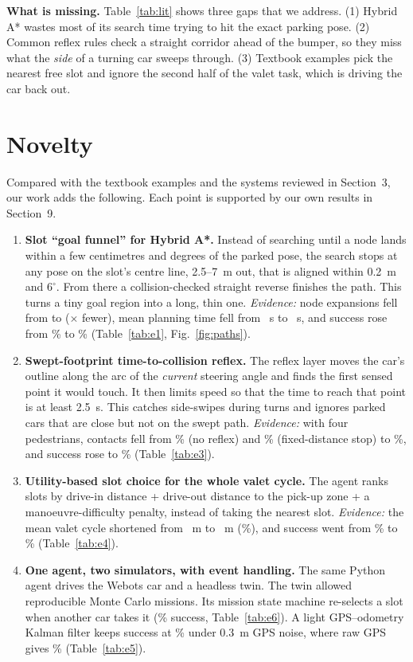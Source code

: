 \documentclass[12pt,a4paper]{article}
\begin{document}
\textbf{What is missing.} Table~\ref{tab:lit} shows three gaps that we address. (1) Hybrid A* wastes most of its search time trying to hit the exact parking pose. (2) Common reflex rules check a straight corridor ahead of the bumper, so they miss what the \emph{side} of a turning car sweeps through. (3) Textbook examples pick the nearest free slot and ignore the second half of the valet task, which is driving the car back out.

\section{Novelty}
Compared with the textbook examples and the systems reviewed in Section~3, our work adds the following. Each point is supported by our own results in Section~9.

\begin{enumerate}[itemsep=3pt,topsep=2pt]
\item \textbf{Slot ``goal funnel'' for Hybrid A*.} Instead of searching until a node lands within a few centimetres and degrees of the parked pose, the search stops at any pose on the slot's centre line, 2.5--7~m out, that is aligned within 0.2~m and $6^\circ$. From there a collision-checked straight reverse finishes the path. This turns a tiny goal region into a long, thin one. \emph{Evidence:} node expansions fell from \EOneExpNoFunnel{} to \EOneExpFunnel{} (\EOneExpRatio$\times$ fewer), mean planning time fell from \EOnePlanNoFunnel{}~s to \EOnePlanFunnel{}~s, and success rose from \EOneSuccNoFunnel\% to \EOneSuccFunnel\% (Table~\ref{tab:e1}, Fig.~\ref{fig:paths}).
\item \textbf{Swept-footprint time-to-collision reflex.} The reflex layer moves the car's outline along the arc of the \emph{current} steering angle and finds the first sensed point it would touch. It then limits speed so that the time to reach that point is at least 2.5~s. This catches side-swipes during turns and ignores parked cars that are close but not on the swept path. \emph{Evidence:} with four pedestrians, contacts fell from \EThreeCollNone\% (no reflex) and \EThreeCollFixed\% (fixed-distance stop) to \EThreeCollTTC\%, and success rose to \EThreeSuccTTC\% (Table~\ref{tab:e3}).
\item \textbf{Utility-based slot choice for the whole valet cycle.} The agent ranks slots by drive-in distance + drive-out distance to the pick-up zone + a manoeuvre-difficulty penalty, instead of taking the nearest slot. \emph{Evidence:} the mean valet cycle shortened from \EFourCycleNear{}~m to \EFourCycleUtil{}~m (\EFourCycleGain\%), and success went from \EFourSuccNear\% to \EFourSuccUtil\% (Table~\ref{tab:e4}).
\item \textbf{One agent, two simulators, with event handling.} The same Python agent drives the Webots car and a headless twin. The twin allowed \NMissions{} reproducible Monte Carlo missions. Its mission state machine re-selects a slot when another car takes it (\ESevenSucc\% success, Table~\ref{tab:e6}). A light GPS--odometry Kalman filter keeps success at \EFiveKFThree\% under 0.3~m GPS noise, where raw GPS gives \EFiveRawThree\% (Table~\ref{tab:e5}).
\end{enumerate}
\end{document}
